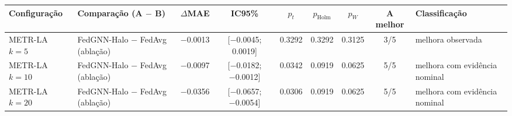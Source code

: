 
\begin{tabular}{>{\raggedright\arraybackslash}l>{\raggedright\arraybackslash}p{3.3cm}cccccc>{\raggedright\arraybackslash}p{3.3cm}}
\toprule
Configuração & Comparação (A $-$ B) & $\Delta$MAE & IC95\% & $p_t$ & $p_{\mathrm{Holm}}$ & $p_W$ & A melhor & Classificação \\
\midrule
METR-LA $k=5$ & FedGNN-Halo − FedAvg (ablação) & \num{-0.0013} & [\num{-0.0045}; \num{+0.0019}] & \num{0.3292} & \num{0.3292} & \num{0.3125} & 3/5 & melhora observada \\
METR-LA $k=10$ & FedGNN-Halo − FedAvg (ablação) & \num{-0.0097} & [\num{-0.0182}; \num{-0.0012}] & \num{0.0342} & \num{0.0919} & \num{0.0625} & 5/5 & melhora com evidência nominal \\
METR-LA $k=20$ & FedGNN-Halo − FedAvg (ablação) & \num{-0.0356} & [\num{-0.0657}; \num{-0.0054}] & \num{0.0306} & \num{0.0919} & \num{0.0625} & 5/5 & melhora com evidência nominal \\
\bottomrule
\end{tabular}
